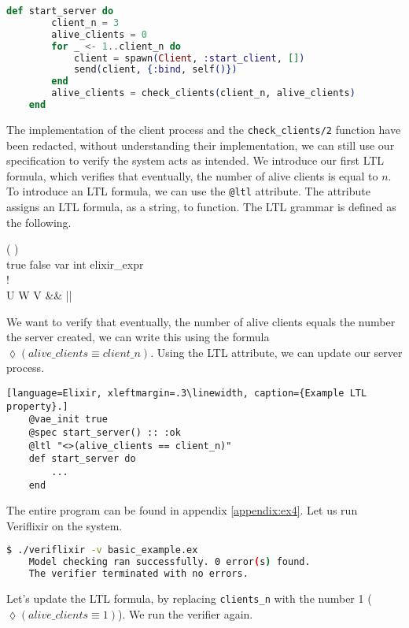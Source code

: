 \begin{lstlisting}[language=Elixir, xleftmargin=.2\linewidth]
    def start_server do
        client_n = 3
        alive_clients = 0
        for _ <- 1..client_n do
            client = spawn(Client, :start_client, [])
            send(client, {:bind, self()})
        end
        alive_clients = check_clients(client_n, alive_clients)
    end
\end{lstlisting}
The implementation of the client process and the \texttt{check\_clients/2} function have been redacted, without understanding their implementation, we can still use our specification to verify the system acts as intended. We introduce our first LTL formula, which verifies that eventually, the number of alive clients is equal to $n$. To introduce an LTL formula, we can use the \texttt{@ltl} attribute. The attribute assigns an LTL formula, as a string, to function. The LTL grammar is defined as the following.
\begin{bnf*}
      { \bnfor (  ) \bnfor {}   \bnfor {} }\\
      {true \bnfor false \bnfor var \bnfor int \bnfor elixir\_expr}\\
      {\square \bnfor \lozenge \bnfor !}\\
      {U \bnfor W \bnfor V \bnfor \&\& \bnfor || \bnfor \rightarrow \bnfor \leftrightarrow }\\
\end{bnf*}
We want to verify that eventually, the number of alive clients equals the number the server created, we can write this using the formula $\lozenge (alive\_clients \equiv client\_n)$. Using the LTL attribute, we can update our server process.
\begin{lstlisting}[language=Elixir, xleftmargin=.3\linewidth, caption={Example LTL property}.]
    @vae_init true
    @spec start_server() :: :ok
    @ltl "<>(alive_clients == client_n)"
    def start_server do
        ...
    end
\end{lstlisting}
The entire program can be found in appendix \ref{appendix:ex4}. Let us run Veriflixir on the system.
\begin{lstlisting}[language=bash, xleftmargin=.3\linewidth]
    $ ./veriflixir -v basic_example.ex
    Model checking ran successfully. 0 error(s) found.
    The verifier terminated with no errors.
\end{lstlisting}
Let's update the LTL formula, by replacing \texttt{clients\_n} with the number 1 ($\lozenge (alive\_clients \equiv 1)$). We run the verifier again.

